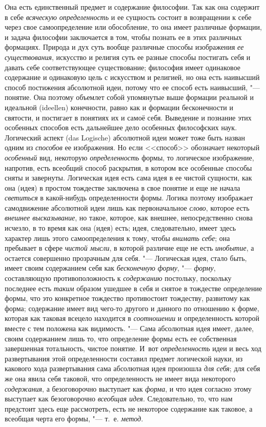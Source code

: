Она есть единственный предмет и содержание философии. Так как
она содержит в себе {\em всяческую
определенность} и ее сущность состоит в возвращении к себе
через свое самоопределение или обособление, то она имеет различные
формации, и задача философии заключается в том, чтобы познать ее в этих
различных формациях. Природа и дух суть вообще различные способы
изображения {\em ее существования},
искусство и религия суть ее разные способы постигать себя и
давать себе соответствующее существование; философия имеет одинаковое
содержание и одинаковую цель с искусством и религией, но она
есть наивысший способ постижения абсолютной идеи, потому что ее способ есть
наивысший, "--- понятие. Она поэтому объемлет собой упомянутые
выше формации реальной и идеальной (ideellen) конечности,
равно как и формации бесконечности и святости, и постигает в понятиях их и
самоё себя. Выведение и познание этих особенных способов есть дальнейшее
дело особенных философских наук. Логический аспект (das Logische)
абсолютной идеи может тоже быть назван одним из
{\em способов} ее
изображения. Но если <<способ>> обозначает некоторый
{\em особенный} вид,
некоторую {\em определенность}
формы, то логическое изображение, напротив, есть всеобщий
способ раскрытия, в котором все особенные способы сняты и завернуты.
Логическая идея есть сама идея в ее чистой сущности, как она (идея) в
простом тождестве заключена в свое понятие и еще не начала
{\em светиться} в
какой-нибудь определенности формы. Логика поэтому изображает самодвижение
абсолютной идеи лишь как первоначальное
{\em слово}, которое есть
{\em внешнее высказывание},
но такое, которое, как внешнее, непосредственно снова
исчезло, в то время как она (идея) есть; идея, следовательно, имеет здесь
характер лишь этого самоопределения к тому, чтобы
{\em внимать себе}; она
пребывает в сфере {\em чистой мысли},
в которой различие еще не есть
{\em инобытие}, а
остается совершенно прозрачным для себя. "--- Логическая идея,
стало быть, имеет своим содержанием себя как
{\em бесконечную форму}, "---
{\em форму}, составляющую
противоположность к {\em содержанию}
постольку, поскольку последнее есть
{\em таким} образом
ушедшее в себя и снятое в тождестве определение формы, что это конкретное
тождество противостоит тождеству, развитому как форма; содержание имеет вид
чего-то другого и данного по отношению к форме, которая как таковая всецело
находится в {\em соотношении}
и определенность которой вместе с тем положена как
видимость. "--- Сама абсолютная идея имеет, далее, своим
содержанием лишь то, что определение формы есть ее собственная завершенная
тотальность, чистое понятие. И~вот
{\em определенность} идеи
и весь ход развертывания этой определенности составил предмет логической
науки, из какового хода развертывания сама абсолютная идея произошла
{\em для себя}; для себя
же она явила себя таковой, что определенность не имеет вида некоторого
{\em содержания}, а
безоговорочно выступает как
{\em форма}, и что идея
согласно этому выступает как безоговорочно
{\em всеобщая идея}.
Следовательно, то, что нам предстоит здесь еще рассмотреть,
есть не некоторое содержание как таковое, а всеобщая черта его формы, "---
т.~е. {\em метод}.


